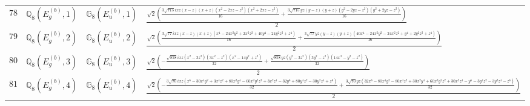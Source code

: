 \documentclass[fleqn,8pt,landscape]{jsarticle}
\begin{document}
\begin{table}[ht!]
\begin{center}
\begin{tabular}{cccl}
$ 78 $ & $ \mathbb{Q}_{8}(E_{g}^{(b)},1) $ & $ \mathbb{G}_{8}(E_{u}^{(b)},1) $ & $ \frac{\sqrt{2} \left(\frac{3 \sqrt{715} i x z \left(x - z\right) \left(x + z\right) \left(x^{2} - 2 x z - z^{2}\right) \left(x^{2} + 2 x z - z^{2}\right)}{16} + \frac{3 \sqrt{715} y z \left(y - z\right) \left(y + z\right) \left(y^{2} - 2 y z - z^{2}\right) \left(y^{2} + 2 y z - z^{2}\right)}{16}\right)}{2} $ \\
$ 79 $ & $ \mathbb{Q}_{8}(E_{g}^{(b)},2) $ & $ \mathbb{G}_{8}(E_{u}^{(b)},2) $ & $ \frac{\sqrt{2} \left(\frac{3 \sqrt{77} i x z \left(x - z\right) \left(x + z\right) \left(x^{4} - 24 x^{2} y^{2} + 2 x^{2} z^{2} + 40 y^{4} - 24 y^{2} z^{2} + z^{4}\right)}{16} + \frac{3 \sqrt{77} y z \left(y - z\right) \left(y + z\right) \left(40 x^{4} - 24 x^{2} y^{2} - 24 x^{2} z^{2} + y^{4} + 2 y^{2} z^{2} + z^{4}\right)}{16}\right)}{2} $ \\
$ 80 $ & $ \mathbb{Q}_{8}(E_{g}^{(b)},3) $ & $ \mathbb{G}_{8}(E_{u}^{(b)},3) $ & $ \frac{\sqrt{2} \left(- \frac{\sqrt{858} i x z \left(x^{2} - 3 z^{2}\right) \left(3 x^{2} - z^{2}\right) \left(x^{2} - 14 y^{2} + z^{2}\right)}{32} + \frac{\sqrt{858} y z \left(y^{2} - 3 z^{2}\right) \left(3 y^{2} - z^{2}\right) \left(14 x^{2} - y^{2} - z^{2}\right)}{32}\right)}{2} $ \\
$ 81 $ & $ \mathbb{Q}_{8}(E_{g}^{(b)},4) $ & $ \mathbb{G}_{8}(E_{u}^{(b)},4) $ & $ \frac{\sqrt{2} \left(- \frac{3 \sqrt{70} i x z \left(x^{6} - 30 x^{4} y^{2} + 3 x^{4} z^{2} + 80 x^{2} y^{4} - 60 x^{2} y^{2} z^{2} + 3 x^{2} z^{4} - 32 y^{6} + 80 y^{4} z^{2} - 30 y^{2} z^{4} + z^{6}\right)}{32} + \frac{3 \sqrt{70} y z \left(32 x^{6} - 80 x^{4} y^{2} - 80 x^{4} z^{2} + 30 x^{2} y^{4} + 60 x^{2} y^{2} z^{2} + 30 x^{2} z^{4} - y^{6} - 3 y^{4} z^{2} - 3 y^{2} z^{4} - z^{6}\right)}{32}\right)}{2} $ \\
 \hline \hline
\end{tabular}
\end{center}
\end{table}
\end{document}
